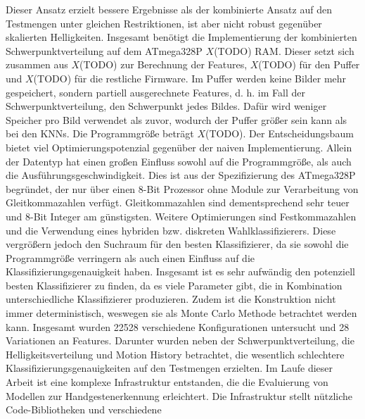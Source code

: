 Dieser Ansatz erzielt bessere Ergebnisse als der kombinierte Ansatz auf den Testmengen unter gleichen Restriktionen, ist aber nicht robust gegenüber skalierten Helligkeiten.
\newline
\newline
Insgesamt benötigt die Implementierung der kombinierten Schwerpunktverteilung auf dem ATmega328P $X$(TODO) RAM. Dieser setzt sich zusammen aus $X$(TODO) zur Berechnung der Features, $X$(TODO) für den Puffer und
$X$(TODO) für die restliche Firmware. Im Puffer werden keine Bilder mehr gespeichert, sondern partiell ausgerechnete Features, d. h. im Fall der Schwerpunktverteilung, den Schwerpunkt jedes Bildes.
Dafür wird weniger Speicher pro Bild verwendet als zuvor, wodurch der Puffer größer sein kann als bei den KNNs. Die Programmgröße beträgt $X$(TODO).
\newline
\newline
Der Entscheidungsbaum bietet viel Optimierungspotenzial gegenüber der naiven Implementierung. Allein der Datentyp hat einen großen Einfluss sowohl auf die Programmgröße, als auch die Ausführungsgeschwindigkeit.
Dies ist aus der Spezifizierung des ATmega328P begründet, der nur über einen 8-Bit Prozessor ohne Module zur Verarbeitung von Gleitkommazahlen verfügt. Gleitkommazahlen sind dementsprechend sehr teuer und 8-Bit
Integer am günstigsten. Weitere Optimierungen sind Festkommazahlen und die Verwendung eines hybriden bzw. diskreten Wahlklassifizierers. Diese vergrößern jedoch den Suchraum für den besten Klassifizierer, da sie
sowohl die Programmgröße verringern als auch einen Einfluss auf die Klassifizierungsgenauigkeit haben.
\newline
\newline
Insgesamt ist es sehr aufwändig den potenziell besten Klassifizierer zu finden, da es viele Parameter gibt, die in Kombination unterschiedliche Klassifizierer produzieren. Zudem ist die
Konstruktion nicht immer deterministisch, weswegen sie als Monte Carlo Methode betrachtet werden kann. Insgesamt wurden 22528 verschiedene Konfigurationen untersucht und 28 Variationen an Features.
Darunter wurden neben der Schwerpunktverteilung, die Helligkeitsverteilung und Motion History betrachtet, die wesentlich schlechtere Klassifizierungsgenauigkeiten auf den Testmengen erzielten.
\newline
\newline
Im Laufe dieser Arbeit ist eine komplexe Infrastruktur entstanden, die die Evaluierung von Modellen zur Handgestenerkennung erleichtert. Die Infrastruktur stellt nützliche Code-Bibliotheken und verschiedene
